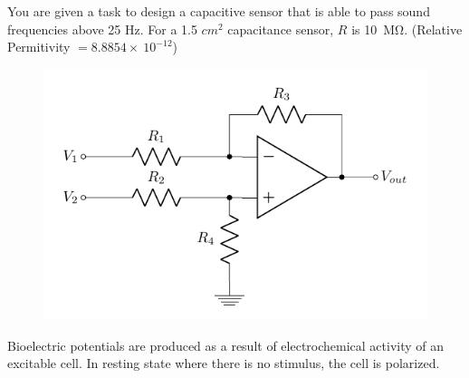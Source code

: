 \documentclass[12pt]{article}
\begin{document}
		

	\listclose %
	
	\item You are given a task to design a capacitive sensor that is able to pass sound frequencies above 25 Hz. For a 1.5 $cm^2$ capacitance sensor, $R$ is 10~\si{\mega\ohm}. (Relative Permitivity $= 8.8854 \times~10^{-12}$)
	
	
	\begin{figure}[H] %
		\centering
		\includegraphics{diffamp}
		\caption{\rajah}
		\label{fig:diffamp}
	\end{figure}
	
\listclose %



\clearpage		%
\question{}

\listbeginx	%
	\item Bioelectric potentials are produced as a result of electrochemical activity of an excitable cell. In resting state where there is no stimulus, the cell is polarized.
	
\end{document}
